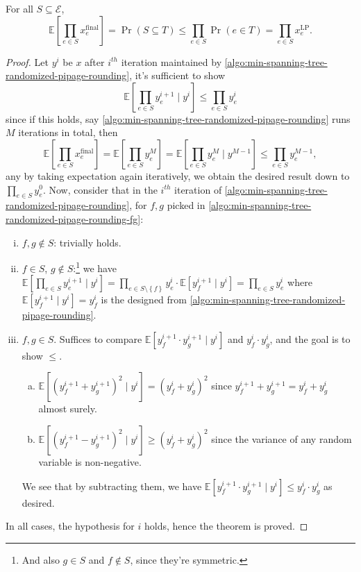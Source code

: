 \begin{theorem}\label{thm:negative-correlation}
	For all \(S \subseteq \mathcal{E} \),
	\[
		\mathbb{E}\left[\prod_{e\in S} x^{\text{final} }_e \right] = \Pr(S \subseteq T) \leq \prod_{e\in S} \Pr(e\in T) = \prod_{e\in S} x^{\text{LP} }_e.
	\]
\end{theorem}
\begin{proof}
	Let \(y^i\) be \(x\) after \(i^{th} \) iteration maintained by \autoref{algo:min-spanning-tree-randomized-pipage-rounding}, it's sufficient to show
	\[
		\mathbb{E}\left[\prod\limits_{e\in S} y^{i+1}_e \mid y^i\right] \leq \prod\limits_{e\in S} y^i_e
	\]
	since if this holds, say \autoref{algo:min-spanning-tree-randomized-pipage-rounding} runs \(M\) iterations in total, then
	\[
		\mathbb{E}\left[\prod\limits_{e\in S} x_e^{\text{final} } \right]
		= \mathbb{E}\left[\prod\limits_{e\in S} y_e^{M} \right]
		= \mathbb{E}\left[\prod\limits_{e\in S} y_e^{M} \mid y^{M-1} \right]
		\leq \prod\limits_{e\in S} y_e^{M-1},
	\]
	any by taking expectation again iteratively, we obtain the desired result down to \(\prod_{e\in S} y^0_e\). Now, consider that in the \(i^{th} \) iteration of \autoref{algo:min-spanning-tree-randomized-pipage-rounding}, for \(f, g\) picked in \autoref{algo:min-spanning-tree-randomized-pipage-rounding-fg}:
	\begin{enumerate}[(i)]
		\item \(f, g \notin S\): trivially holds.
		\item \(f\in S\), \(g \notin S\):\footnote{And also \(g\in S\) and \(f \notin S\), since they're symmetric.} we have \(\mathbb{E}\left[\prod_{e\in S} y^{i+1}_e \mid y^i\right] = \prod_{e\in S\setminus \left\{ f \right\} } y_e^i \cdot \mathbb{E}\left[y_f^{i+1} \mid y^i\right] = \prod_{e\in S} y_e^i\) where \(\mathbb{E}\left[y_f^{i+1} \mid y^i\right] = y^i_f\) is the designed from \autoref{algo:min-spanning-tree-randomized-pipage-rounding}.
		\item \(f, g\in S\). Suffices to compare \(\mathbb{E}\left[y_f^{i+1} \cdot y_g^{i+1} \mid y^i \right] \) and \(y_f^i \cdot y_g^i\), and the goal is to show \(\leq \).
		      \begin{enumerate}[(a)]
			      \item \(\mathbb{E}\left[(y_f^{i+1} + y_g^{i+1})^{2} \mid y^i \right] = (y_f^i + y_g^i)^{2} \) since \(y_f^{i+1} + y_g^{i+1} = y_f^i + y_g^i\) almost surely.
			      \item \(\mathbb{E}\left[(y_f^{i+1} - y_g^{i+1})^{2} \mid y^i \right] \geq (y_f^i + y_g^i)^{2} \) since the variance of any random variable is non-negative.
		      \end{enumerate}
		      We see that by subtracting them, we have \(\mathbb{E}\left[y_f^{i+1}\cdot y_g^{i+1} \mid y^i\right] \leq y_f^i\cdot y_g^i\) as desired.
	\end{enumerate}
	In all cases, the hypothesis for \(i\) holds, hence the theorem is proved.
\end{proof}